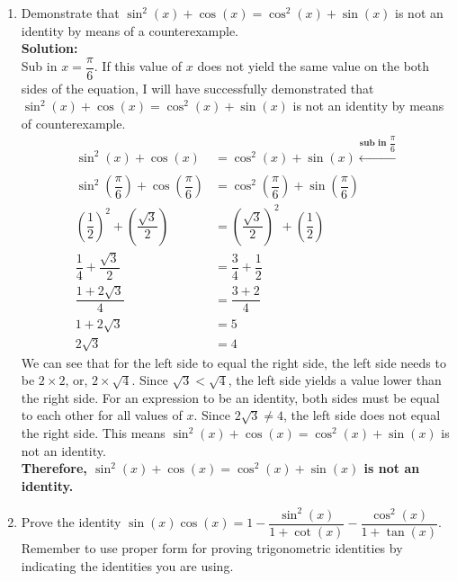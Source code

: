\documentclass[12pt]{book}
\begin{document}
\begin{enumerate}

\item Demonstrate that $\sin^2(x) + \cos(x) = \cos^2(x) + \sin(x)$ is not an identity by means of a counterexample.\\


\textbf{Solution:}\\
Sub in $x = \dfrac{\pi}{6}$. If this value of $x$ does not yield the same value on the both sides of the equation, I will have successfully demonstrated that $\sin^2(x) + \cos(x) = \cos^2(x) + \sin(x)$ is not an identity by means of counterexample.\\
\begingroup
\addtolength{\jot}{0.5em}
\begin{align*}
    \sin^2(x) + \cos(x) &= \cos^2(x) + \sin(x)\xleftarrow[]{\textbf{sub in $\dfrac{\pi}{6}$}}\\ %
    \sin^2\left(\dfrac{\pi}{6}\right) + \cos\left(\dfrac{\pi}{6}\right) &= \cos^2\left(\dfrac{\pi}{6}\right) + \sin\left(\dfrac{\pi}{6}\right)\\ %
    \left(\dfrac{1}{2}\right)^2 + \left(\dfrac{\sqrt{3}}{2}\right) &= \left(\dfrac{\sqrt{3}}{2}\right)^2 + \left(\dfrac{1}{2}\right)\\ %
    \dfrac{1}{4} + \dfrac{\sqrt{3}}{2} &= \dfrac{3}{4} + \dfrac{1}{2}\\ %
    \dfrac{1 + 2\sqrt{3}}{4} &= \dfrac{3+2}{4}\\
    1+2\sqrt{3} &= 5\\
    2\sqrt{3} &= 4
\end{align*}
\endgroup
We can see that for the left side to equal the right side, the left side needs to be $2\times2$, or, $2\times \sqrt{4}$. Since $\sqrt{3} < \sqrt{4}$, the left side yields a value lower than the right side. For an expression to be an identity, both sides must be equal to each other for all values of $x$. Since $2\sqrt{3} \neq 4$, the left side does not equal the right side. This means $\sin^2(x) + \cos(x) = \cos^2(x) + \sin(x)$ is not an identity.\\

\textbf{Therefore, $\sin^2(x) + \cos(x) = \cos^2(x) + \sin(x)$ is not an identity.}

\vspace{0.3cm}

\newpage

\item Prove the identity $\sin(x)\cos(x)=1-\dfrac{\sin^2(x)}{1+\cot(x)}-\dfrac{\cos^2(x)}{1+\tan(x)}$. Remember to use proper form for proving trigonometric identities by indicating the identities you are using.\\


\end{enumerate}
\end{document}
